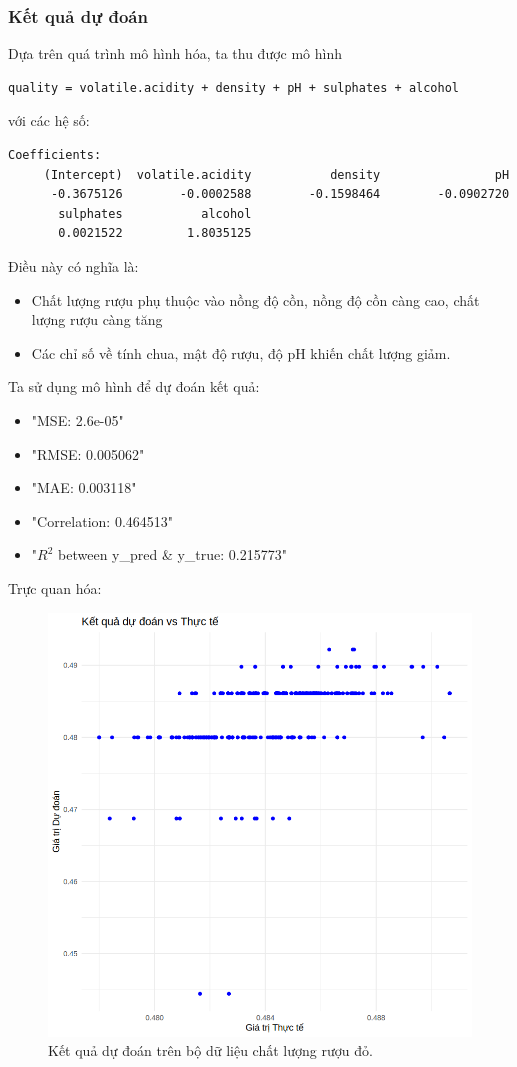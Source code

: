 \subsubsection{Kết quả dự đoán}

Dựa trên quá trình mô hình hóa, ta thu được mô hình

\begin{lstlisting}
quality = volatile.acidity + density + pH + sulphates + alcohol
\end{lstlisting}

với các hệ số:
\begin{lstlisting}
Coefficients:
     (Intercept)  volatile.acidity           density                pH  
      -0.3675126        -0.0002588        -0.1598464        -0.0902720  
       sulphates           alcohol  
       0.0021522         1.8035125 
\end{lstlisting}

Điều này có nghĩa là:
\begin{itemize}
    \item  Chất lượng rượu phụ thuộc vào nồng độ cồn, nồng độ cồn càng cao, chất lượng rượu càng tăng
    \item Các chỉ số về tính chua, mật độ rượu, độ pH khiến chất lượng giảm.
\end{itemize}

Ta sử dụng mô hình để dự đoán kết quả:
\begin{itemize}
    \item "MSE: 2.6e-05"
    \item "RMSE: 0.005062"
    \item "MAE: 0.003118"
    \item "Correlation: 0.464513"
    \item "$R^2$ between y\_pred \& y\_true: 0.215773"
\end{itemize}
Trực quan hóa:
\begin{figure}[H]
    \centering
    \includegraphics[width=0.75\columnwidth]{wine_figures/red_pred.png}
    \caption{Kết quả dự đoán trên bộ dữ liệu chất lượng rượu đỏ.}
    \label{fig:red_pred}
\end{figure}


